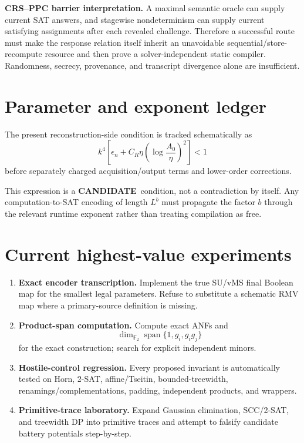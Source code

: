 \documentclass[11pt]{article}
\newcommand{\statuscandidate}{\textcolor{candidate}{\textbf{CANDIDATE}}}
\newcommand{\Ftwo}{\mathbb{F}_2}
\begin{document}
\begin{candidatebox}
\textbf{CRS--PPC barrier interpretation.}
A maximal semantic oracle can supply current SAT answers, and stagewise nondeterminism can supply
current satisfying assignments after each revealed challenge. Therefore a successful route must
make the response relation itself inherit an unavoidable sequential/store-recompute resource and
then prove a solver-independent static compiler. Randomness, secrecy, provenance, and transcript
divergence alone are insufficient.
\end{candidatebox}
\section{Parameter and exponent ledger}

The present reconstruction-side condition is tracked schematically as
\[
\boxed{
k^4
\left[
  \epsilon_n
  +
  C_R\eta\!\left(\log\frac{A_0}{\eta}\right)^2
\right]
<1
}
\]
before separately charged acquisition/output terms and lower-order corrections.

This expression is a \statuscandidate\ condition, not a contradiction by itself. Any
computation-to-SAT encoding of length \(L^b\) must propagate the factor \(b\) through the relevant
runtime exponent rather than treating compilation as free.

\section{Current highest-value experiments}

\begin{enumerate}
  \item \textbf{Exact encoder transcription.}
        Implement the true SU/vMS final Boolean map for the smallest legal parameters. Refuse to
        substitute a schematic RMV map where a primary-source definition is missing.
  \item \textbf{Product-span computation.}
        Compute exact ANFs and
        \[
          \dim_{\Ftwo}\operatorname{span}\{1,g_i,g_i g_j\}
        \]
        for the exact construction; search for explicit independent minors.
  \item \textbf{Hostile-control regression.}
        Every proposed invariant is automatically tested on Horn, 2-SAT, affine/Tseitin,
        bounded-treewidth, renamings/complementations, padding, independent products, and wrappers.
  \item \textbf{Primitive-trace laboratory.}
        Expand Gaussian elimination, SCC/2-SAT, and treewidth DP into primitive traces and attempt to
        falsify candidate battery potentials step-by-step.
\end{enumerate}
\end{document}

